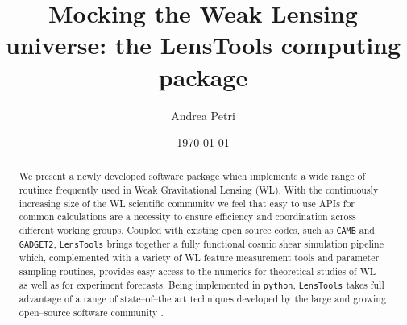 \documentclass[reprint,aps,prd,superscriptaddress,showkeys,showpacs]{revtex4-1}
\newcommand{\ttt}[1]{\texttt{#1}}
\newcommand{\LT}{\texttt{LensTools} }
\begin{document}
\title{Mocking the Weak Lensing universe: the LensTools computing package}

\author{Andrea Petri}

\date{\today}

\label{firstpage}

\begin{abstract}
We present a newly developed software package which implements a wide range of routines frequently used in Weak Gravitational Lensing (WL). With the continuously increasing size of the WL scientific community we feel that easy to use APIs for common calculations are a necessity to ensure efficiency and coordination across different working groups. Coupled with existing open source codes, such as \ttt{CAMB}\citep{CAMB} and \ttt{GADGET2}\citep{Gadget2}, \LT brings together a fully functional cosmic shear simulation pipeline which, complemented with a variety of WL feature measurement tools and parameter sampling routines, provides easy access to the numerics for theoretical studies of WL as well as for experiment forecasts. Being implemented in \ttt{python}\citep{python}, \LT takes full advantage of a range of state--of--the art techniques developed by the large and growing open--source software community \citep{scipy,pandas,astropy}.    
    
\end{abstract}



\maketitle


\end{document}
